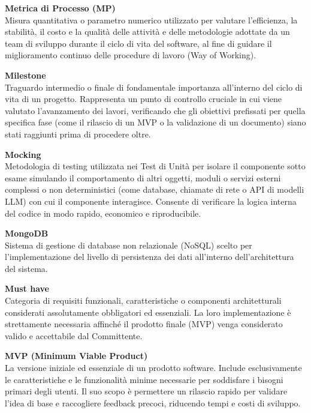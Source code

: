 \documentclass[12pt, a4paper]{article}
\begin{document}
\noindent\hypertarget{metrica-di-processo}{\textbf{Metrica di Processo (MP)}} \\[0.1em]
Misura quantitativa o parametro numerico utilizzato per valutare l'efficienza, la stabilità, il costo e la qualità delle attività e delle metodologie adottate da un team di sviluppo durante il ciclo di vita del software, al fine di guidare il miglioramento continuo delle procedure di lavoro (Way of Working).
\vspace{0.5cm}

\noindent\hypertarget{milestone}{\textbf{Milestone}} \\[0.1em]
Traguardo intermedio o finale di fondamentale importanza all'interno del ciclo di vita di un progetto. Rappresenta un punto di controllo cruciale in cui viene valutato l'avanzamento dei lavori, verificando che gli obiettivi prefissati per quella specifica fase (come il rilascio di un MVP o la validazione di un documento) siano stati raggiunti prima di procedere oltre.
\vspace{0.5cm}

\noindent\hypertarget{mocking}{\textbf{Mocking}} \\[0.1em]
Metodologia di testing utilizzata nei Test di Unità per isolare il componente sotto esame simulando il comportamento di altri oggetti, moduli o servizi esterni complessi o non deterministici (come database, chiamate di rete o API di modelli LLM) con cui il componente interagisce. Consente di verificare la logica interna del codice in modo rapido, economico e riproducibile.
\vspace{0.5cm}

\noindent\hypertarget{mongodb}{\textbf{MongoDB}} \\[0.1em]
Sistema di gestione di database non relazionale (NoSQL) scelto per l'implementazione del livello di persistenza dei dati all'interno dell'architettura del sistema.
\vspace{0.5cm}  

\noindent\hypertarget{must-have}{\textbf{Must have}} \\[0.1em]
Categoria di requisiti funzionali, caratteristiche o componenti architetturali considerati assolutamente obbligatori ed essenziali. La loro implementazione è strettamente necessaria affinché il prodotto finale (MVP) venga considerato valido e accettabile dal Committente.
\vspace{0.5cm}

\noindent\hypertarget{mvp}{\textbf{MVP (Minimum Viable Product)}} \\[0.1em]
La versione iniziale ed essenziale di un prodotto software. Include esclusivamente le caratteristiche e le funzionalità minime necessarie per soddisfare i bisogni primari degli utenti. Il suo scopo è permettere un rilascio rapido per validare l'idea di base e raccogliere feedback precoci, riducendo tempi e costi di sviluppo.
\vspace{0.1cm}
\end{document}
